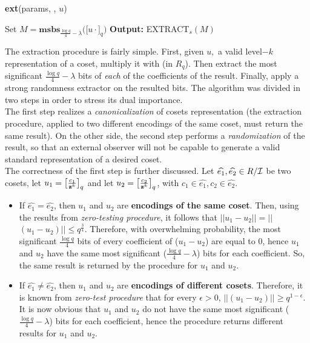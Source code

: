 \begin{enumerate}[label=(\alph*)]
\begin{tcolorbox}[colframe=black,colback=white,arc=0pt,outer arc=0pt]
	\begin{center}
		\textbf{ext}(params, \pzt, $u$)
	\end{center}
	\begin{algorithmic}[1]
		\State Set $M = \textbf{msbs}_{\frac{\log q}{4} - \lambda} \big([u \cdot $\pzt$]_q\big)$
		\Statex
		\State \textbf{Output:}  EXTRACT$_s(M)$
	\end{algorithmic}
\end{tcolorbox}

The extraction procedure is fairly simple. First, given $u,$ a valid level$-k$ representation of a coset, multiply it with {\pzt} (in $R_q$). Then extract the most significant $\frac{\log q}{4} - \lambda$ bits of \textit{each} of the coefficients of the result. Finally, apply a strong randomness extractor on the resulted bits. The algorithm was divided in two steps in order to stress its dual importance.\\

 The first step realizes a \textit{canonicalization} of cosets representation (the extraction procedure, applied to two different encodings of the same coset, must return the same result). On the other side, the second step performs a \textit{randomization} of the result, so that an external observer will not be capable to generate a valid standard representation of a desired coset. \\
 
 The correctness of the first step is further discussed. Let $\widehat{e_1}, \widehat{e_2} \in R/\mathcal{I}$ be two cosets, let $u_1 = \big[ \frac{c_1}{\textbf{z}^k} \big]_q$ and let $u_2 = \big[ \frac{c_2}{\textbf{z}^k} \big]_q$, with $c_1 \in \widehat{e_1}, c_2 \in \widehat{e_2}$.
 \begin{itemize}
 	\item If $\widehat{e_1} = \widehat{e_2}$, then $u_1$ and $u_2$ are \textbf{encodings of the same coset}. Then, using the results from \textit{zero-testing procedure}, it follows that $||$\pzt$u_1 - $\pzt$u_2|| = || $ \pzt $(u_1 - u_2)|| \leq q^{\frac{3}{4}}$. Therefore, with overwhelming probability, the most significant $\frac{\log q}{4}$ bits of every coefficient of (\pzt$u_1 - $\pzt$u_2$) are equal to 0, hence \pzt$u_1$ and \pzt$u_2$ have the same most significant ($\frac{\log q}{4} - \lambda$) bits for each coefficient. So, the same result is returned by the procedure for $u_1$ and $u_2$.
 	
 	\item If $\widehat{e_1} \neq \widehat{e_2}$, then $u_1$ and $u_2$ are \textbf{encodings of different cosets}. Therefore, it is known from \textit{zero-test procedure} that for every $\epsilon > 0$, $||$\pzt$(u_1-u_2)|| \geq q^{1 - \epsilon}$. It is now obvious that \pzt$u_1$ and \pzt$u_2$ do not have the same most significant ($\frac{\log q}{4} - \lambda$) bits for each coefficient, hence the procedure returns different results for $u_1$ and $u_2$.
 \end{itemize}




\end{enumerate}
